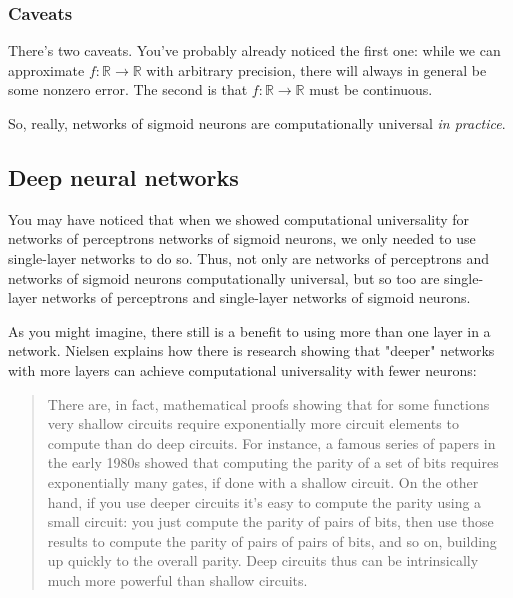 \documentclass{article}
\begin{document}
	\subsubsection*{Caveats}
	
	There's two caveats. You've probably already noticed the first one: while we can approximate $f:\mathbb{R} \rightarrow \mathbb{R}$ with arbitrary precision, there will always in general be some nonzero error. The second is that $f:\mathbb{R} \rightarrow \mathbb{R}$ must be continuous.
	
	So, really, networks of sigmoid neurons are computationally universal \textit{in practice}.
	
	\subsection*{Deep neural networks}
	
	You may have noticed that when we showed computational universality for networks of perceptrons networks of sigmoid neurons, we only needed to use single-layer networks to do so. Thus, not only are networks of perceptrons and networks of sigmoid neurons computationally universal, but so too are single-layer networks of perceptrons and single-layer networks of sigmoid neurons.
	
	As you might imagine, there still is a benefit to using more than one layer in a network. Nielsen explains how there is research showing that "deeper" networks with more layers can achieve computational universality with fewer neurons:
	
	\begin{quote}
		There are, in fact, mathematical proofs showing that for some functions very shallow circuits require exponentially more circuit elements to compute than do deep circuits. For instance, a famous series of papers in the early 1980s showed that computing the parity of a set of bits requires exponentially many gates, if done with a shallow circuit. On the other hand, if you use deeper circuits it's easy to compute the parity using a small circuit: you just compute the parity of pairs of bits, then use those results to compute the parity of pairs of pairs of bits, and so on, building up quickly to the overall parity. Deep circuits thus can be intrinsically much more powerful than shallow circuits.
	\end{quote}
\end{document}

